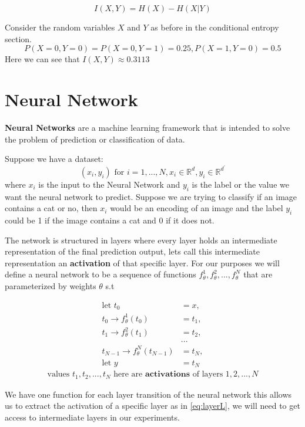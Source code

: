 \begin{equation}
  I(X, Y) = H(X) - H(X|Y)
\label{eq:miEntropy}
\end{equation}

Consider the random variables $X$ and $Y$ as before in the conditional entropy
section. 
$$P(X=0,Y=0) = P(X=0,Y=1) = 0.25, P(X=1,Y=0) = 0.5$$
Here we can see that $I(X,Y) \approx 0.3113$

\section{Neural Network}

\textbf{Neural Networks} are a machine learning framework that is intended to
solve the problem of prediction or classification of data. 

Suppose we have a dataset:
$$ (x_i, y_i) \text{ for } i = 1,...,N, x_i \in \mathbb{R}^d, y_i \in \mathbb{R}^{d^\prime}$$ 
where $x_i$ is the input to the Neural Network and $y_i$ is the label or the
value we want the neural network to predict. Suppose we are trying to classify
if an image contains a cat or no, then $x_i$ would be an encoding of an image
and the label $y_i$ could be 1 if the image contains a cat and 0 if it does not.

The network is structured in layers where every layer holds an intermediate
representation of the final prediction output, lets call this intermediate
representation an \textbf{activation} of that specific layer. For our purposes
we will define a neural network to be a sequence of functions
$f_{\theta}^1,f_{\theta}^2,...,f_{\theta}^N$ that are parameterized by weights
$\theta$ s.t

\begin{align*}
  \text{let } t_0 &= x, \\
    t_0 \rightarrow f_{\theta}^1(t_0) &= t_1,\\
    t_1 \rightarrow f_{\theta}^2(t_1) &= t_2,\\
    &...\\
    t_{N-1} \rightarrow f_{\theta}^N(t_{N-1}) &= t_N,\\
    \text{let } y &= t_N
\end{align*}
\begin{align*}
    \text{values } t_1,t_2,...,t_N 
    \text{ here are } \textbf{activations } \text{of layers } 1,2,...,N
\end{align*}

We have one function for each layer transition of the neural network this allows
us to extract the activation of a specific layer as in \autoref{eq:layerL}, we
will need to get access to intermediate layers in our experiments.


